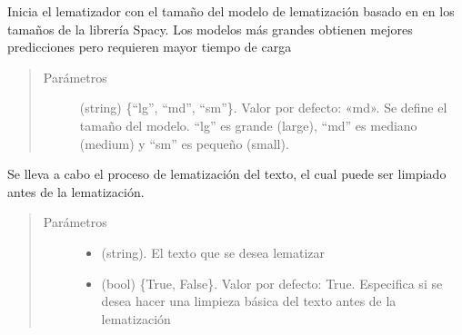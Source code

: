 \documentclass[letterpaper,10pt,openany,spanish]{sphinxmanual}
\begin{document}
\begin{fulllineitems}
\begin{fulllineitems}
\label{\detokenize{funciones/lematizacion:lematizacion.LematizadorSpacy.iniciar_lematizador}}
Inicia el lematizador con el tamaño del modelo de lematización basado en             en los tamaños de la librería Spacy. Los modelos más grandes obtienen mejores             predicciones pero requieren mayor tiempo de carga
\begin{quote}\begin{description}
\item[{Parámetros}] \leavevmode
{} \textendash{} (string) \{“lg”, “md”, “sm”\}. Valor por defecto: «md». Se define             el tamaño del modelo. “lg” es grande (large), “md” es mediano (medium) y “sm” es             pequeño (small).

\end{description}\end{quote}

\end{fulllineitems}


\begin{fulllineitems}
\label{\detokenize{funciones/lematizacion:lematizacion.LematizadorSpacy.lematizar}}
Se lleva a cabo el proceso de lematización del texto, el cual puede             ser limpiado antes de la lematización.
\begin{quote}\begin{description}
\item[{Parámetros}] \leavevmode\begin{itemize}
\item {} 
 \textendash{} (string). El texto que se desea lematizar

\item {} 
 \textendash{} (bool) \{True, False\}. Valor por defecto: True. Especifica             si se desea hacer una limpieza básica del texto antes de la lematización

\end{itemize}


\end{description}
\end{quote}
\end{fulllineitems}
\end{fulllineitems}
\end{document}
